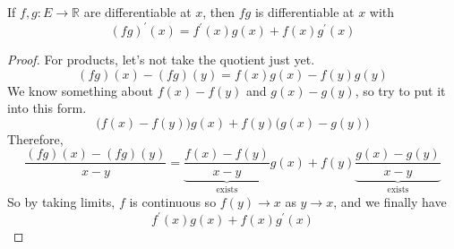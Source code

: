 	\begin{lemma}
		\label{thm:product_rule}
		If $f, g: E \to \mathbb{R}$ are differentiable at $x$, then $fg$ is differentiable at $x$ with 
		\begin{equation}
			(fg)^\prime (x) = f^\prime (x) g(x) + f(x) g^\prime (x)
		\end{equation}
	\end{lemma}
	\begin{proof}
		For products, let's not take the quotient just yet. 
		\begin{equation}
			(fg)(x) - (fg)(y) = f(x) g(x) - f(y) g(y) 
		\end{equation}
		We know something about $f(x) - f(y)$ and $g(x) - g(y)$, so try to put it into this form. 
		\begin{equation}
			\big(f(x) - f(y) \big) g(x) + f(y) \big( g(x) - g(y) \big)
		\end{equation}
		Therefore, 
		\begin{equation}
			\frac{(fg)(x) - (fg) (y)}{x - y} = \underbrace{\frac{f(x) - f(y)}{x - y}}_{\text{exists}} g(x) + f(y) \underbrace{\frac{g(x) - g(y)}{x - y}}_{\text{exists}}
		\end{equation}
		So by taking limits, $f$ is continuous so $f(y) \to x$ as $y \to x$, and we finally have 
		\begin{equation}
			f^\prime (x) g(x) + f(x) g^\prime (x)
		\end{equation}
	\end{proof}

